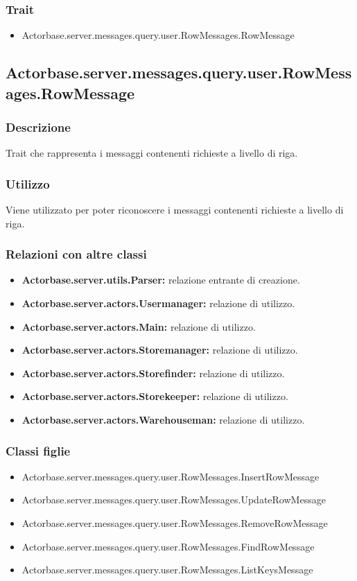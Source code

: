 \documentclass[a4paper]{article}
\begin{document}
			\subsubsection{Trait}
				\begin{itemize}
					\item Actorbase.server.messages.query.user.RowMessages.RowMessage
				\end{itemize}
		
		\subsection{Actorbase.server.messages.query.user.RowMessages.RowMessage}
			\subsubsection{Descrizione}
				Trait che rappresenta i messaggi contenenti richieste a livello di riga.
				
			\subsubsection{Utilizzo}
				Viene utilizzato per poter riconoscere i messaggi contenenti richieste a livello di riga.
			\subsubsection{Relazioni con altre classi}
				\begin{itemize}
					\item \textbf{Actorbase.server.utils.Parser:} relazione entrante di creazione.
					\item \textbf{Actorbase.server.actors.Usermanager:} relazione di utilizzo.
					\item \textbf{Actorbase.server.actors.Main:} relazione di utilizzo.
					\item \textbf{Actorbase.server.actors.Storemanager:} relazione di utilizzo.
					\item \textbf{Actorbase.server.actors.Storefinder:} relazione di utilizzo.
					\item \textbf{Actorbase.server.actors.Storekeeper:} relazione di utilizzo.
					\item \textbf{Actorbase.server.actors.Warehouseman:} relazione di utilizzo.
				\end{itemize}
			\subsubsection{Classi figlie}
				\begin{itemize}
					\item Actorbase.server.messages.query.user.RowMessages.InsertRowMessage
					\item Actorbase.server.messages.query.user.RowMessages.UpdateRowMessage
					\item Actorbase.server.messages.query.user.RowMessages.RemoveRowMessage
					\item Actorbase.server.messages.query.user.RowMessages.FindRowMessage
					\item Actorbase.server.messages.query.user.RowMessages.ListKeysMessage
				\end{itemize}
		
\end{document}
